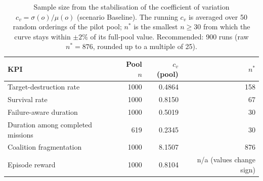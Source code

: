 \begin{table}[htbp]
  \centering
  \caption{Sample size from the stabilisation of the coefficient of variation $c_v=\sigma(o)/\mu(o)$ (scenario Baseline). The running $c_v$ is averaged over 50 random orderings of the pilot pool; $n^*$ is the smallest $n \geq 30$ from which the curve stays within $\pm2\%$ of its full-pool value. Recommended: 900 runs (raw $n^*=876$, rounded up to a multiple of 25).}
  \label{tab:cv_stabilisation_Baseline}
  \begin{tabular}{lrrr}
    \toprule
    KPI & Pool $n$ & $c_v$ (pool) & $n^*$ \\
    \midrule
    Target-destruction rate & 1000 & 0.4864 & 158 \\
    Survival rate & 1000 & 0.8150 & 67 \\
    Failure-aware duration & 1000 & 0.5019 & 30 \\
    Duration among completed missions & 619 & 0.2345 & 30 \\
    Coalition fragmentation & 1000 & 8.1507 & 876 \\
    Episode reward & 1000 & 0.8104 & n/a (values change sign) \\
    \bottomrule
  \end{tabular}
\end{table}
